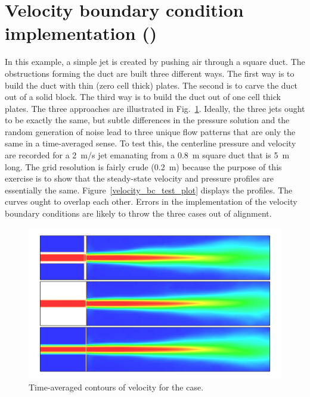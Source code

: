 \documentclass[11pt]{book}
\begin{document}
\section{Velocity boundary condition implementation (\texorpdfstring{}{velocity\_bc\_test})}
\label{velocity_bc_test}

In this example, a simple jet is created by pushing air through a square duct. The obstructions forming the duct are built three different ways. The first way is to build the duct with thin (zero cell thick) plates. The second is to carve the duct out of a solid block. The third way is to build the duct out of one cell thick plates. The three approaches are illustrated in Fig.~\ref{velocity_bc_test_image}. Ideally, the three jets ought to be exactly the same, but subtle differences in the pressure solution and the random generation of noise lead to three unique flow patterns that are only the same in a time-averaged sense. To test this, the centerline pressure and velocity are recorded for a 2~m/s jet emanating from a 0.8~m square duct that is 5~m long. The grid resolution is fairly crude (0.2~m) because the purpose of this exercise is to show that the steady-state velocity and pressure profiles are essentially the same. Figure~\ref{velocity_bc_test_plot} displays the profiles. The curves ought to overlap each other. Errors in the implementation of the velocity boundary conditions are likely to throw the three cases out of alignment.

\begin{figure}[!ht]
\centering
\includegraphics[width=\textwidth]{SCRIPT_FIGURES/velocity_bc_test}
\caption[Images of the  test case]{Time-averaged contours of velocity for the  case.}
\label{velocity_bc_test_image}
\end{figure}
\end{document}
